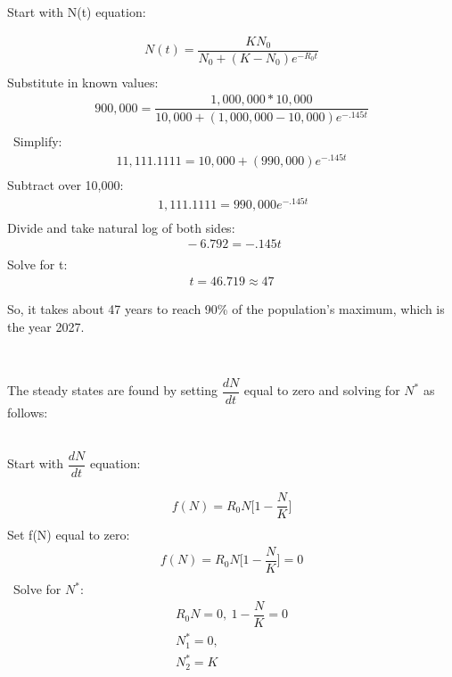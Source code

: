 \documentclass[12pt]{article}
\begin{document}
\begin{flushleft}
Start with N(t) equation:
\end{flushleft}
\begin{gather*}
N(t) = \dfrac{KN_0}{N_0+(K-N_0)e^{-R_0t}} \\
\end{gather*}
Substitute in known values:
\begin{gather*}
900,000 = \dfrac{1,000,000*10,000}{10,000+(1,000,000-10,000)e^{-.145t}} \\
\end{gather*}\
Simplify:	
\begin{gather*}
11,111.1111 = 10,000+(990,000)e^{-.145t} \\
\end{gather*}
Subtract over 10,000:		
\begin{gather*}\
1,111.1111 = 990,000e^{-.145t} \\
\end{gather*}
Divide and take natural log of both sides:	
\begin{gather*}\
-6.792 = -.145t \\
\end{gather*}
Solve for t:	
\begin{gather*}
t = 46.719 \approx 47 
\end{gather*}

\begin{center}
So, it takes about 47 years to reach 90\% of the population's maximum, which is the year 2027.
\end{center}\

The steady states are found by setting $\dfrac{dN}{dt}$ equal to zero and solving for $N^{*}$  as follows:\\\

\begin{flushleft}
Start with $\dfrac{dN}{dt}$ equation:
\end{flushleft}
\begin{gather*}
f(N) = R_0N\Big[1 - \dfrac{N}{K}\Big]  \\
\end{gather*}
Set f(N) equal to zero:
\begin{gather*}
f(N) = R_0N\Big[1 - \dfrac{N}{K}\Big] = 0 \\
\end{gather*}\
Solve for $N^*$:	
\begin{gather*}
 R_0N = 0,\ 1 - \dfrac{N}{K} = 0\\
 N^*_1 = 0,\\ N^*_2 = K\\
\end{gather*}
\end{document}
